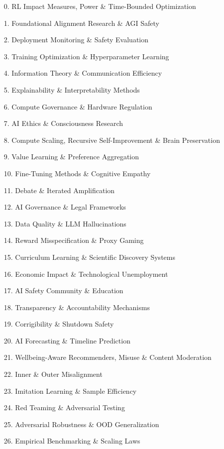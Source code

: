 \documentclass[10pt,twocolumn,letterpaper]{article}
\begin{document}
\begin{small}
\begin{enumerate}
\setlength{\itemsep}{0pt}
\item[0.] RL Impact Measures, Power \& Time-Bounded Optimization
\item[1.] Foundational Alignment Research \& AGI Safety
\item[2.] Deployment Monitoring \& Safety Evaluation
\item[3.] Training Optimization \& Hyperparameter Learning
\item[4.] Information Theory \& Communication Efficiency
\item[5.] Explainability \& Interpretability Methods
\item[6.] Compute Governance \& Hardware Regulation
\item[7.] AI Ethics \& Consciousness Research
\item[8.] Compute Scaling, Recursive Self-Improvement \& Brain Preservation
\item[9.] Value Learning \& Preference Aggregation
\item[10.] Fine-Tuning Methods \& Cognitive Empathy
\item[11.] Debate \& Iterated Amplification
\item[12.] AI Governance \& Legal Frameworks
\item[13.] Data Quality \& LLM Hallucinations
\item[14.] Reward Misspecification \& Proxy Gaming
\item[15.] Curriculum Learning \& Scientific Discovery Systems
\item[16.] Economic Impact \& Technological Unemployment
\item[17.] AI Safety Community \& Education
\item[18.] Transparency \& Accountability Mechanisms
\item[19.] Corrigibility \& Shutdown Safety
\item[20.] AI Forecasting \& Timeline Prediction
\item[21.] Wellbeing-Aware Recommenders, Misuse \& Content Moderation
\item[22.] Inner \& Outer Misalignment
\item[23.] Imitation Learning \& Sample Efficiency
\item[24.] Red Teaming \& Adversarial Testing
\item[25.] Adversarial Robustness \& OOD Generalization
\item[26.] Empirical Benchmarking \& Scaling Laws

\end{enumerate}
\end{small}
\end{document}
